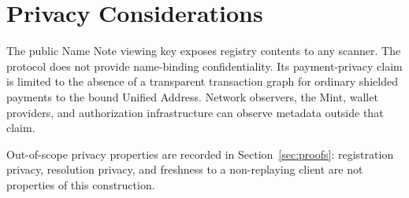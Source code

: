 \section{Privacy Considerations}
\label{sec:privacy}

The public Name Note viewing key exposes registry contents to any scanner.
The protocol does not provide name-binding confidentiality.
Its payment-privacy claim is limited to the absence of a transparent transaction graph for ordinary shielded payments to the bound Unified Address.
Network observers, the Mint, wallet providers, and authorization infrastructure can observe metadata outside that claim.

Out-of-scope privacy properties are recorded in Section~\ref{sec:proofs}: registration privacy, resolution privacy, and freshness to a non-replaying client are not properties of this construction.